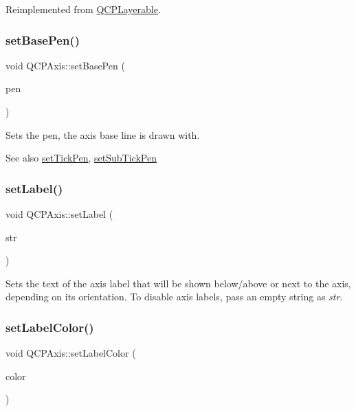 Reimplemented from \hyperlink{classQCPLayerable_a04db8351fefd44cfdb77958e75c6288e}{Q\+C\+P\+Layerable}.

\mbox{\label{classQCPAxis_a778d45fb71b3c7ab3bb7079e18b058e4}} 
\subsubsection{\texorpdfstring{set\+Base\+Pen()}{setBasePen()}}
{\footnotesize\ttfamily void Q\+C\+P\+Axis\+::set\+Base\+Pen (\begin{DoxyParamCaption}\item[{const Q\+Pen \&}]{pen }\end{DoxyParamCaption})}

Sets the pen, the axis base line is drawn with.

\begin{DoxySeeAlso}{See also}
\hyperlink{classQCPAxis_ad80923bcc1c5da4c4db602c5325e797e}{set\+Tick\+Pen}, \hyperlink{classQCPAxis_aede4028ae7516bd51a60618a8233f9cf}{set\+Sub\+Tick\+Pen} 
\end{DoxySeeAlso}
\mbox{\label{classQCPAxis_a33bcc382c111c9f31bb0687352a2dea4}} 
\subsubsection{\texorpdfstring{set\+Label()}{setLabel()}}
{\footnotesize\ttfamily void Q\+C\+P\+Axis\+::set\+Label (\begin{DoxyParamCaption}\item[{const Q\+String \&}]{str }\end{DoxyParamCaption})}

Sets the text of the axis label that will be shown below/above or next to the axis, depending on its orientation. To disable axis labels, pass an empty string as {\itshape str}. \mbox{\label{classQCPAxis_a6c906fe56d75f0122335b9f79b999608}} 
\subsubsection{\texorpdfstring{set\+Label\+Color()}{setLabelColor()}}
{\footnotesize\ttfamily void Q\+C\+P\+Axis\+::set\+Label\+Color (\begin{DoxyParamCaption}\item[{const Q\+Color \&}]{color }\end{DoxyParamCaption})}

